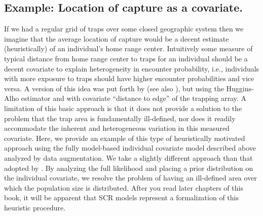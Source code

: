 \subsection{Example: Location of capture as a covariate.}

If we had a regular grid of traps over some closed geographic system
then we imagine that the average location of capture would be a decent
estimate (heuristically) of an individual's home range center.
Intuitively some measure of typical distance from home range center to
traps for an individual should be a decent covariate to explain
heterogeneity in encounter probability, i.e., individuals with more
exposure to traps should have higher encounter probabilities and vice
versa.  A version of this idea was put forth by
\citet{boulanger_mclellan:2001} (see also \citet{ivan:2012}), but
using the Huggins-Alho estimator and with covariate ``distance to
edge'' of the trapping array. A limitation of this basic approach is
that it does not provide a solution to the problem that the trap area
is fundamentally ill-defined, nor does it readily accommodate the
inherent and heterogeneous variation in this measured covariate.
Here, we provide an example of this type of heuristically motivated
approach using the fully model-based individual covariate model
described above analyzed by data augmentation. We take a slightly
different approach than that adopted by
\citet{boulanger_mclellan:2001}. By analyzing the full likelihood and
placing a prior distribution on the individual covariate, we resolve
the problem of having an ill-defined area over which the population
size is distributed. After you read later chapters of this book, it
will be apparent that SCR models represent a formalization of this
heuristic procedure.

